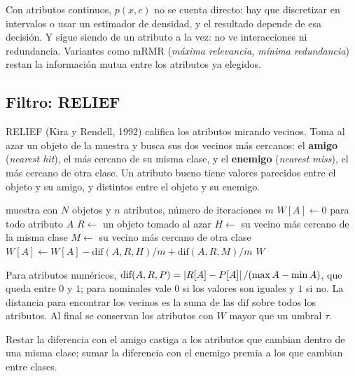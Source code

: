 \documentclass[11pt,letterpaper]{article}
\begin{document}
\begin{ojo}
    Con atributos continuos, $p(x, c)$ no se cuenta directo: hay que
    discretizar en intervalos o usar un estimador de densidad, y el
    resultado depende de esa decisión. Y sigue siendo de un atributo a
    la vez: no ve interacciones ni redundancia. Variantes como mRMR
    (\textit{máxima relevancia, mínima redundancia}) restan la
    información mutua entre los atributos ya elegidos.
\end{ojo}


\subsection*{Filtro: RELIEF}

RELIEF (Kira y Rendell, 1992) califica los atributos mirando vecinos.
Toma al azar un objeto de la muestra y busca sus dos vecinos más
cercanos: el \textbf{amigo} (\textit{nearest hit}), el más cercano de
su misma clase, y el \textbf{enemigo} (\textit{nearest miss}), el más
cercano de otra clase. Un atributo bueno tiene valores parecidos entre
el objeto y su amigo, y distintos entre el objeto y su enemigo.

\begin{algorithm}[H]
\caption{RELIEF}
\begin{algorithmic}[1]
\Require muestra con $N$ objetos y $n$ atributos, número de
         iteraciones $m$
\State $W[A] \gets 0$ para todo atributo $A$
  \State $R \gets$ un objeto tomado al azar
  \State $H \gets$ su vecino más cercano de la misma clase
  \State $M \gets$ su vecino más cercano de otra clase
    \State $W[A] \gets W[A] - \text{dif}(A, R, H)/m
                         + \text{dif}(A, R, M)/m$
  \EndFor
\EndFor
\State \Return $W$
\end{algorithmic}
\end{algorithm}

Para atributos numéricos,
$\text{dif}(A, R, P) = \left\lvert R[A] - P[A] \right\rvert / (\max A - \min A)$, que
queda entre $0$ y $1$; para nominales vale $0$ si los valores son
iguales y $1$ si no. La distancia para encontrar los vecinos es la suma
de las $\text{dif}$ sobre todos los atributos. Al final se conservan
los atributos con $W$ mayor que un umbral $\tau$.

Restar la diferencia con el amigo castiga a los atributos que cambian
dentro de una misma clase; sumar la diferencia con el enemigo premia a
los que cambian entre clases.
\end{document}
